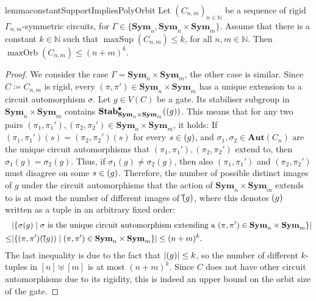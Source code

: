 \documentclass[10pt,a4paper]{article}
\theoremstyle{definition}
\theoremstyle{plain}
\theoremstyle{remark}
\newcommand{\Aut}{\mathbf{Aut}}
\newcommand{\Sym}{\mathbf{Sym}}
\newcommand{\Stab}{\mathbf{Stab}}
\newcommand{\StabP}{\Stab^{\bullet}}
\newcommand{\bbN}{\mathbb{N}}
\let\sup\relax
\DeclareMathOperator{\sup}{sup}
\DeclareMathOperator{\maxOrb}{maxOrb}
\DeclareMathOperator{\maxSup}{maxSup}
\begin{document}
\begin{restatable}{lemma}{constantSupportImpliesPolyOrbit}\label{lem:constantSupportImpliesPolyOrbit}
	Let $(C_{n,m})_{n \in \bbN}$ be a sequence of rigid $\Gamma_{n,m}$-symmetric circuits, for $\Gamma \in \{\Sym_n, \Sym_n \times \Sym_m\}$. Assume that there is a constant $k \in \bbN$ such that $\maxSup(C_{n,m}) \leq k$, for all $n,m \in \bbN$.
	Then $\maxOrb(C_{n,m}) \leq (n+m)^k$.
\end{restatable}
\begin{proof}		
	We consider the case $\Gamma = \Sym_n \times \Sym_m$, the other case is similar.
	Since $C \coloneqq C_{n,m}$ is rigid, every $(\pi, \pi') \in \Sym_n \times \Sym_m$ has a unique extension to a circuit automorphism $\sigma$. 
	Let $g \in V(C)$ be a gate. Its stabiliser subgroup in $\Sym_n \times \Sym_m$ contains $\StabP
	_{\Sym_n \times \Sym_m}(\sup(g))$. 
	This means that for any two pairs $(\pi_1, \pi_1'), (\pi_2, \pi_2') \in \Sym_n \times \Sym_m$, it holds: If $(\pi_1, \pi_1')(s) = (\pi_2, \pi_2')(s)$ for every $s \in \sup(g)$, and $\sigma_1, \sigma_2 \in \Aut(C_n)$ are the unique circuit automorphisms that $(\pi_1, \pi_1'), (\pi_2, \pi_2')$ extend to, then $\sigma_1(g) = \sigma_2(g)$. Thus, if $\sigma_1(g) \neq \sigma_2(g)$, then also $(\pi_1, \pi_1')$ and $(\pi_2, \pi_2')$ must disagree on some $s \in \sup(g)$. 
	Therefore, the number of possible distinct images of $g$ under the circuit automorphisms that the action of $\Sym_n \times \Sym_m$ extends to is at most the number of different images of $\vec{\sup}(g)$, where this denotes $\sup(g)$ written as a tuple in an arbitrary fixed order:
	\begin{align*}
		&|\{ \sigma(g) \mid \sigma \text{ is the unique circuit automorphism extending a } (\pi, \pi') \in \Sym_n \times \Sym_m   \}|\\
		\leq
		&|\{ (\pi, \pi')(\vec{\sup}(g)) \mid (\pi, \pi') \in \Sym_n \times \Sym_m   \}| \leq (n+m)^k.
	\end{align*}
	The last inequality is due to the fact that $|\sup(g)| \leq k$, so the number of different $k$-tuples in $[n] \uplus [m]$ is at most $(n+m)^k$.
	Since $C$ does not have other circuit automorphisms due to its rigidity, this is indeed an upper bound on the orbit size of the gate.
\end{proof}
\end{document}
